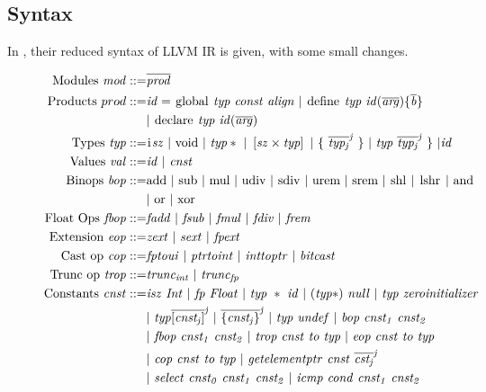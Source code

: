 \subsection{Syntax}
In , their reduced syntax of LLVM IR is given, with some small changes.\begin{figure}[!htb]
\begin{align*}
\begin{aligned}
\text{Modules }\mathit{mod} ::= &\overline{\mathit{prod}} \\
\text{Products }prod ::= & \mathit{id =\ }\kw{global}\ \mathit{typ}\ \mathit{const}\ \mathit{align}\ |\ \kw{define} \mathit{\ typ\ id(\overline{arg})\{\overline{b}\}}\\
&|\ \kw{declare} \mathit{\ typ\ id(\overline{arg})} \\
\text{Types } \mathit{typ} ::= &\kw{i} \mathit{sz\ |\ } \kw{void} \mathit{\ |\ typ*\ |\ \left[sz \times typ\right]\ |\ \lbrace\ \overline{typ_{j}}^{j}\ \rbrace\ |\ typ\ \overline{typ_{j}}^{j}\ \rbrace\ | id} \\
\text{Values } \mathit{val} ::= &\mathit{ id\ |\ cnst} \\
\text{Binops } \mathit{bop} ::= &\kw{add} \ |\ \kw{sub}\ |\ \kw{mul}\ |\ \kw{udiv}\ |\ \kw{sdiv}\ |\ \kw{urem}\ |\ \kw{srem}\ |\ \kw{shl}\ |\ \kw{lshr}\ |\ \kw{and}\\
&|\ \kw{or}\ |\ \kw{xor} \\
\text{Float Ops } \mathit{fbop} ::= &\mathit{fadd \ |\ fsub \ |\ fmul \ |\ fdiv \ |\ frem} \\
\text{Extension } \mathit{eop} ::= &\mathit{zext \ |\ sext \ |\ fpext} \\
\text{Cast op } \mathit{cop} ::= &\mathit{fptoui \ |\ ptrtoint \ |\ inttoptr \ |\ bitcast} \\
\text{Trunc op } \mathit{trop} ::= &\mathit{trunc_{int} \ |\ trunc_{fp}} \\
%
%
\text{Constants } \mathit{cnst} ::= &\mathit{isz\ Int\ |\ fp\ Float\ |\ typ\ *\ id\ |\ (typ*)\ null\ |\ typ\ zeroinitializer} \\
&\mathit{|\ typ\overline{[cnst_{j}]}^{j}\ |\ \overline{\lbrace cnst_{j} \rbrace}^{j}\ |\ typ\ undef\ |\ bop\ cnst_{1}\ cnst_{2}} \\
&\mathit{|\ fbop\ cnst_{1}\ cnst_{2}\ |\ trop\ cnst\ to\ typ\ |\ eop\ cnst\ to\ typ}\\
&\mathit{|\ cop\ cnst\ to\ typ\ |\ getelementptr\ cnst\ \overline{cst_{j}}^{j}}\\
&\mathit{|\ select\ cnst_{0}\ cnst_{1}\ cnst_{2}\ |\ icmp\ cond\ cnst_{1}\ cnst_{2}}\\

\end{aligned}
\end{align*}
\end{figure}
